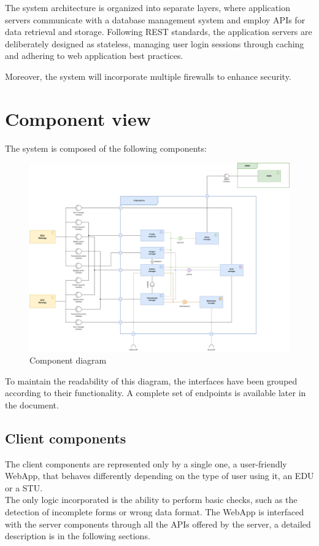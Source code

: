 The system architecture is organized into separate layers, where application servers communicate with a database management system and employ APIs for data retrieval and storage. 
Following REST standards, the application servers are deliberately designed as stateless, managing user login sessions through caching and adhering to web application best practices. 

Moreover, the system will incorporate multiple firewalls to enhance security.

\section{Component view}

The system is composed of the following components:

\begin{figure}[H]
    \centering
    \includegraphics[width=\textwidth]{images/diagrams/component_diagram.png}
    \caption{Component diagram}
\end{figure}

To maintain the readability of this diagram, the interfaces have been grouped according to their functionality.
A complete set of endpoints is available later in the document.

\subsection{Client components}
The client components are represented only by a single one, a user-friendly WebApp, that behaves differently depending on the type of user using it, an EDU or a STU. \\
The only logic incorporated is the ability to perform basic checks, such as the detection of incomplete forms or wrong data format. 
The WebApp is interfaced with the server components through all the APIs offered by the server, a detailed description is in the following sections.
